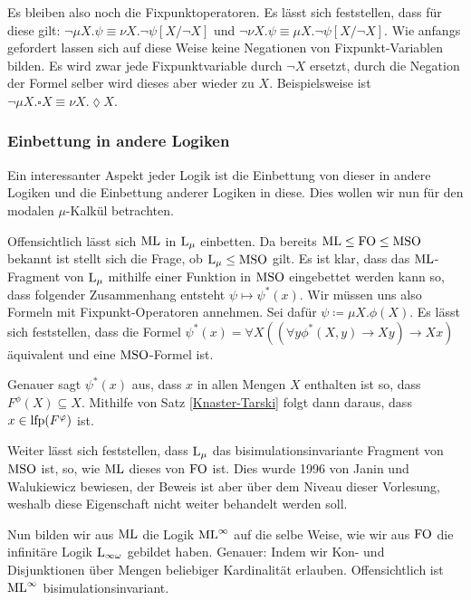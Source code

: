 Es bleiben also noch die Fixpunktoperatoren. Es lässt sich feststellen, dass für diese gilt: $\neg\mu X .\psi \equiv \nu X . \neg\psi[X/\neg X]$ und $\neg\nu X.\psi \equiv \mu X.\neg\psi[X/\neg X]$. Wie anfangs gefordert lassen sich auf diese Weise keine Negationen von Fixpunkt-Variablen bilden. Es wird zwar jede Fixpunktvariable durch $\neg X$ ersetzt, durch die Negation der Formel selber wird dieses aber wieder zu $X$. Beispielsweise ist $\neg\mu X .\square X \equiv \nu X . \lozenge X$.

\subsubsection*{Einbettung in andere Logiken}

Ein interessanter Aspekt jeder Logik ist die Einbettung von dieser in andere Logiken und die Einbettung anderer Logiken in diese. Dies wollen wir nun für den modalen $\mu$-Kalkül betrachten.

Offensichtlich lässt sich $\operatorname{ML}$ in $\operatorname{L}_\mu$ einbetten. Da bereits $\operatorname{ML} \leq \operatorname{FO} \leq \operatorname{MSO}$ bekannt ist stellt sich die Frage, ob $\operatorname{L}_\mu\leq \operatorname{MSO}$ gilt. Es ist klar, dass das $\operatorname{ML}$-Fragment von $\operatorname{L}_\mu$ mithilfe einer Funktion in $\operatorname{MSO}$ eingebettet werden kann so, dass folgender Zusammenhang entsteht $\psi \mapsto \psi^\ast(x)$. Wir müssen uns also Formeln mit Fixpunkt-Operatoren annehmen. 
Sei dafür $\psi\coloneqq \mu X . \phi(X)$. Es lässt sich feststellen, dass die Formel $\psi^\ast(x)=\forall X ((\forall y \phi^\ast(X,y)\rightarrow Xy) \rightarrow Xx)$ äquivalent und eine $\operatorname{MSO}$-Formel ist.

Genauer sagt $\psi^\ast(x)$ aus, dass $x$ in allen Mengen $X$ enthalten ist so, dass $F^\phi(X)\subseteq X$. Mithilfe von Satz \ref{Knaster-Tarski} folgt dann daraus, dass $x\in \operatorname{lfp}(F^\varphi)$ ist.

Weiter lässt sich feststellen, dass $\operatorname{L}_\mu$ das bisimulationsinvariante Fragment von $\operatorname{MSO}$ ist, so, wie $\operatorname{ML}$ dieses von $\operatorname{FO}$ ist. Dies wurde 1996 von Janin und Walukiewicz bewiesen, der Beweis ist aber über dem Niveau dieser Vorlesung, weshalb diese Eigenschaft nicht weiter behandelt werden soll.

Nun bilden wir aus $\operatorname{ML}$ die Logik $\operatorname{ML}^\infty$ auf die selbe Weise, wie wir aus $\operatorname{FO}$ die infinitäre Logik $\operatorname{L}_{\infty\omega}$ gebildet haben. Genauer: Indem wir Kon- und Disjunktionen über Mengen beliebiger Kardinalität erlauben. Offensichtlich ist $\operatorname{ML}^\infty$ bisimulationsinvariant.

